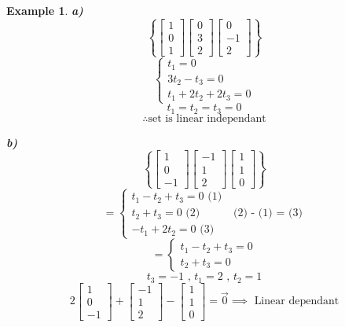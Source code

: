 \documentclass{article}
\newtheorem{ex}[theorem]{Example}
\begin{document}
\begin{ex}
\begin{minipage}{.5\textwidth} %
\textbf{a)}
\[\left\{ \begin{bmatrix} 1 \\ 0 \\ 1\end{bmatrix} \begin{bmatrix} 0 \\ 3 \\ 2 \end{bmatrix} \begin{bmatrix} 0 \\ -1 \\ 2\end{bmatrix} \right\}\]
\[ \begin{cases} t_1 = 0 \\ 3t_2 - t_3 = 0 \\ t_1 + 2t_2 + 2t_3 = 0 \end{cases} \]
\[t_1 = t_2 = t_3 = 0 \]
\[\therefore \text{set is linear independant} \]
\end{minipage} %
\begin{minipage}{.5\textwidth} %
\textbf{b)}
\[\left\{ \begin{bmatrix} 1 \\ 0 \\ -1\end{bmatrix} \begin{bmatrix} -1 \\ 1 \\ 2 \end{bmatrix} \begin{bmatrix} 1 \\ 1 \\ 0\end{bmatrix} \right\}\]
\[=  \begin{cases} t_1 - t_2 + t_3 = 0 \text{ (1) } \\ t_2 + t_3 = 0 \text{ (2) } \\ -t_1 + 2t_2 = 0 \text{ (3) } \end{cases}  \text{ (2) - (1) = (3) }\]
\[= \begin{cases} t_1 - t_2 + t_3 = 0 \\ t_2 + t_3 = 0 \end{cases} \]
\[ t_3 = -1 \text{ , } t_1 = 2 \text{ , } t_2 = 1\]
\[ 2 \begin{bmatrix} 1 \\ 0 \\ -1\end{bmatrix} +  \begin{bmatrix} -1 \\ 1 \\ 2 \end{bmatrix} - \begin{bmatrix} 1 \\ 1 \\ 0\end{bmatrix}  = \vec{0} \implies \text{ Linear dependant}  \]
\end{minipage}
\end{ex}
\end{document}
